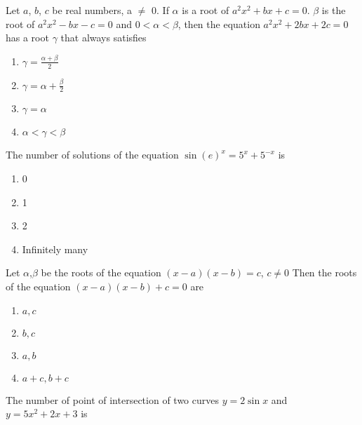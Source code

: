 \iffalse
    \title{Assignment}
    \author{Pendem nitesh sri satya - AI24BTECH11026}
    \section{mcq-single}
  \fi

 \item Let $a$, $b$, $c$ be real numbers, a $\neq$ 0. If $\alpha$ is a root of $a^{2}x^{2}+bx+c=0$. $\beta$ is the root of $a^{2}x^{2}-bx-c=0$ and 0$<$$\alpha$$<$$\beta$, then the equation $a^{2}x^{2}+2bx+2c=0$ has a root $\gamma$ that always satisfies  \hfill {}
 \begin{multicols}{2}
\begin{enumerate}
\item $\gamma=\frac{\alpha+\beta}{2}$  
\item $\gamma=\alpha+\frac{\beta}{2}$
\item $\gamma=\alpha$ 
\item $\alpha<\gamma<\beta$
\end{enumerate}
\end{multicols}
 \item The number of solutions of the equation $\sin{(e)^{x}}=5^{x}+5^{-x}$ is \hfill  {}
 \begin{multicols}{2}
 \begin{enumerate}
\item 0  
\item 1          
\item 2  
\item Infinitely many
\end{enumerate}
\end{multicols}
 \item Let $\alpha$,$\beta$ be the roots of the equation $(x-a)(x-b)=c$, $c \neq 0$ Then the roots of the equation $(x-a)(x-b)+c=0$ are \hfill  {}
 \begin{multicols}{2}
 \begin{enumerate}
\item $a,c$ 
\item $b,c$
\item $a,b$ 
\item $a+c,b+c$
\end{enumerate}
\end{multicols}
 \item The number of point of intersection of two curves $y=2\sin{x}$ and $y=5x^{2}+2x+3$ is \hfill {}
$$
